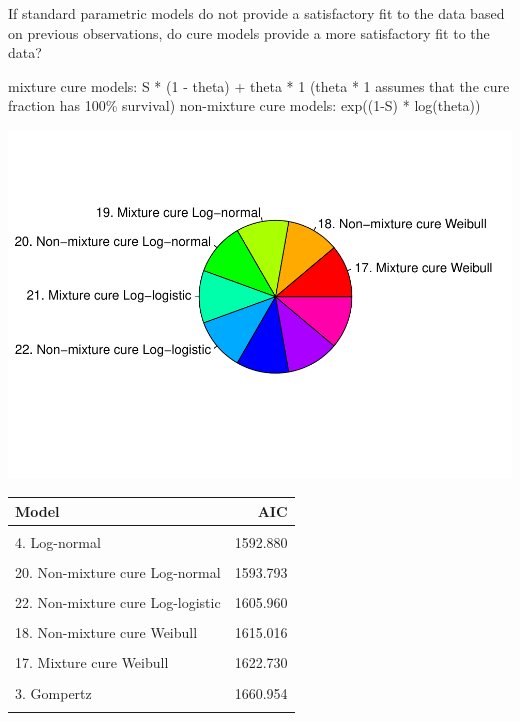 \documentclass[]{article}
\begin{document}
If standard parametric models do not provide a satisfactory fit to the
data based on previous observations, do cure models provide a more
satisfactory fit to the data?

mixture cure models: S * (1 - theta) + theta * 1 (theta * 1 assumes that
the cure fraction has 100\% survival) non-mixture cure models: exp((1-S)
* log(theta))

\begin{flushleft}\includegraphics{Images/cure-1} \end{flushleft}

\begin{table}[H]
\centering
\begin{tabular}{lr}
\toprule
Model & AIC\\
\midrule
\cellcolor{gray!6}{7. Generalised Gamma} & \cellcolor{gray!6}{1589.049}\\
4. Log-normal & 1592.880\\
\cellcolor{gray!6}{19. Mixture cure Log-normal} & \cellcolor{gray!6}{1593.762}\\
20. Non-mixture cure Log-normal & 1593.793\\
\cellcolor{gray!6}{21. Mixture cure Log-logistic} & \cellcolor{gray!6}{1604.290}\\
22. Non-mixture cure Log-logistic & 1605.960\\
\cellcolor{gray!6}{5. Log-logistic} & \cellcolor{gray!6}{1609.294}\\
18. Non-mixture cure Weibull & 1615.016\\
\cellcolor{gray!6}{6. Gamma} & \cellcolor{gray!6}{1621.982}\\
17. Mixture cure Weibull & 1622.730\\
\cellcolor{gray!6}{2. Weibull} & \cellcolor{gray!6}{1632.618}\\
3. Gompertz & 1660.954\\
\cellcolor{gray!6}{1. Exponential} & \cellcolor{gray!6}{1668.212}\\
\bottomrule
\end{tabular}
\end{table}
\end{document}
